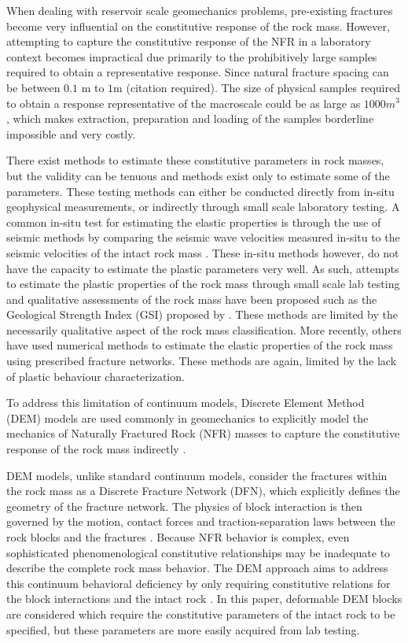 When dealing with reservoir scale geomechanics problems, pre-existing fractures become very influential on the constitutive response of the rock mass. However, attempting to capture the constitutive response of the NFR in a laboratory context becomes impractical due primarily to the prohibitively large samples required to obtain a representative response. Since natural fracture spacing can be between $0.1$ m to $1$m (citation required). The size of physical samples required to obtain a response representative of the macroscale could be as large as $1000 m^3$, which makes extraction, preparation and loading of the samples borderline impossible and very costly. 

There exist methods to estimate these constitutive parameters in rock masses, but the validity can be tenuous and methods exist only to estimate some of the parameters. These testing methods can either be conducted directly from in-situ geophysical measurements, or indirectly through small scale laboratory testing. A common in-situ test for estimating the elastic properties is through the use of seismic methods by comparing the seismic wave velocities measured in-situ to the seismic velocities of the intact rock mass \citep{SJOGREN_1979}. These in-situ methods however, do not have the capacity to estimate the plastic parameters very well. As such, attempts to estimate the plastic properties of the rock mass through small scale lab testing and qualitative assessments of the rock mass have been proposed such as the Geological Strength Index (GSI) proposed by \citet{Hoek_1997}. These methods are limited by the necessarily qualitative aspect of the rock mass classification. More recently, others \citep{Min_2003,Chen_2012,Bidgoli_2013} have used numerical methods to estimate the elastic properties of the rock mass using prescribed fracture networks. These methods are again, limited by the lack of plastic behaviour characterization. 

To address this limitation of continuum models, Discrete Element Method (DEM) models are used commonly in geomechanics to explicitly model the mechanics of Naturally Fractured Rock (NFR) masses to capture the constitutive response of the rock mass indirectly \citep{jing_review_2003}. 

DEM models, unlike standard continuum models, consider the fractures within the rock mass as a Discrete Fracture Network (DFN), which explicitly defines the geometry of the fracture network. The physics of block interaction is then governed by the motion, contact forces and traction-separation laws between the rock blocks and the fractures \citep{Thallak_1990}. Because NFR behavior is complex, even sophisticated phenomenological constitutive relationships may be inadequate to describe the complete rock mass behavior. The DEM approach aims to address this continuum behavioral deficiency by only requiring constitutive relations for the block interactions and the intact rock \cite{Barbosa_1990}. In this paper,  deformable DEM blocks are considered which require the constitutive parameters of the intact rock to be specified, but these parameters are more easily acquired from lab testing. 

